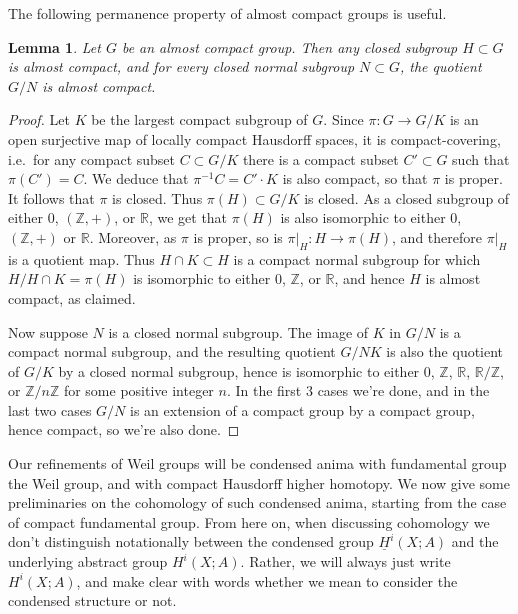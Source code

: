\documentclass[12pt]{article}
\newtheorem{lemma}[theorem]{Lemma}
\theoremstyle{definition}
\newcommand{\mbb}{\mathbb}
\newcommand{\ul}{\underline}
\begin{document}
The following permanence property of almost compact groups is useful.

\begin{lemma}\label{acomppermanence}
Let $G$ be an almost compact group.  Then any closed subgroup $H\subset G$ is almost compact, and for every closed normal subgroup $N\subset G$, the quotient $G/N$ is almost compact.
\end{lemma}
\begin{proof}
Let $K$ be the largest compact subgroup of $G$.  Since $\pi: G \to G/K$ is an open surjective map of locally compact Hausdorff spaces, it is compact-covering, i.e.\ for any compact subset $C \subset G/K$ there is a compact subset $C'\subset G$ such that $\pi(C') = C$.  We deduce that $\pi^{-1}C = C'\cdot K$ is also compact, so that $\pi$ is proper.  It follows that $\pi$ is closed.  Thus $\pi(H)\subset G/K$ is closed.  As a closed subgroup of either $0$, $(\mbb{Z},+)$, or $\mbb{R}$, we get that $\pi(H)$ is also isomorphic to either $0$, $(\mbb{Z},+)$ or $\mbb{R}$.  Moreover, as $\pi$ is proper, so is $\pi|_H: H \to \pi(H)$, and therefore $\pi|_H$ is a quotient map.  Thus $H\cap K \subset H$ is a compact normal subgroup for which $H/H\cap K = \pi(H)$ is isomorphic to either $0$, $\mbb{Z}$, or $\mbb{R}$, and hence $H$ is almost compact, as claimed.

Now suppose $N$ is a closed normal subgroup.  The image of $K$ in $G/N$ is a compact normal subgroup, and the resulting quotient $G/NK$ is also the quotient of $G/K$ by a closed normal subgroup, hence is isomorphic to either $0$, $\mbb{Z}$, $\mbb{R}$, $\mbb{R}/\mbb{Z}$, or $\mbb{Z}/n\mbb{Z}$ for some positive integer $n$.  In the first 3 cases we're done, and in the last two cases $G/N$ is an extension of a compact group by a compact group, hence compact, so we're also done.
\end{proof}

Our refinements of Weil groups will be condensed anima with fundamental group the Weil group, and with compact Hausdorff higher homotopy.  We now give some preliminaries on the cohomology of such condensed anima, starting from the case of compact fundamental group.  From here on, when discussing cohomology we don't distinguish notationally between the condensed group $\ul{H}^i(X;A)$ and the underlying abstract group $H^i(X;A)$.  Rather, we will always just write $H^i(X;A)$, and make clear with words whether we mean to consider the condensed structure or not.
\end{document}
